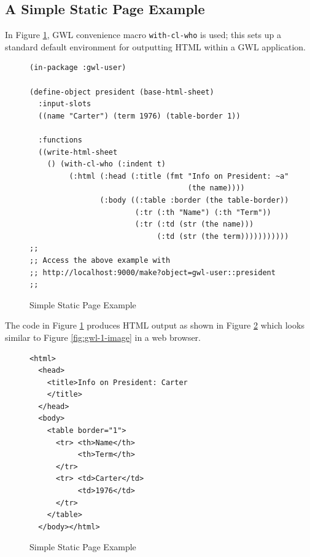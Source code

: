 \documentclass [11pt]{book}
\begin{document}
\subsection{A Simple Static Page Example}

\label{subsec:asimplestaticpageexample}



In Figure 
\ref{fig:gwl-1}, GWL convenience macro \texttt{with-cl-who} is used; this sets up a standard default environment for outputting HTML 
within a GWL application.
\begin{figure}
\begin{lrbox}{\boxedverb}
\begin{minipage}{\linewidth}

\begin{verbatim}(in-package :gwl-user)

(define-object president (base-html-sheet)
  :input-slots
  ((name "Carter") (term 1976) (table-border 1))

  :functions
  ((write-html-sheet
    () (with-cl-who (:indent t)
         (:html (:head (:title (fmt "Info on President: ~a" 
                                    (the name))))
                (:body ((:table :border (the table-border))
                        (:tr (:th "Name") (:th "Term"))
                        (:tr (:td (str (the name))) 
                             (:td (str (the term)))))))))))
;;
;; Access the above example with 
;; http://localhost:9000/make?object=gwl-user::president
;;

\end{verbatim}
\end{minipage}
\end{lrbox}
\fbox{\usebox{\boxedverb}}

\caption{Simple Static Page Example}

\label{fig:gwl-1}

\end{figure}




The code in Figure 
\ref{fig:gwl-1} produces HTML output as shown in Figure 
\ref{fig:gwl-1-html} which looks similar to Figure 
\ref{fig:gwl-1-image} in a web browser.
\begin{figure}
\begin{lrbox}{\boxedverb}
\begin{minipage}{\linewidth}

\begin{verbatim}
<html>
  <head>
    <title>Info on President: Carter
    </title>
  </head>
  <body>
    <table border="1">
      <tr> <th>Name</th>
           <th>Term</th>
      </tr>
      <tr> <td>Carter</td>
           <td>1976</td>
      </tr>
    </table>
  </body></html>

\end{verbatim}
\end{minipage}
\end{lrbox}
\fbox{\usebox{\boxedverb}}

\caption{Simple Static Page Example}

\label{fig:gwl-1-html}

\end{figure}
\end{document}
